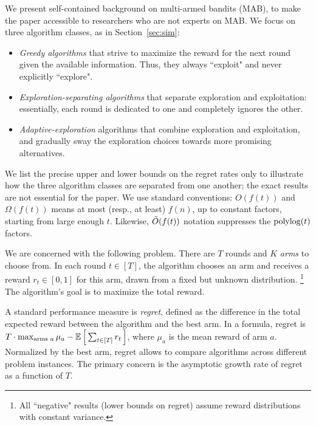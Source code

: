 We present self-contained background on multi-armed bandits (MAB), to make the paper accessible to researchers who are not experts on MAB. We focus on three algorithm classes, as in Section~\ref{sec:sim}:

\begin{itemize}
\item \emph{Greedy algorithms} that strive to maximize the reward for the next round given the available information. Thus, they always ``exploit" and never explicitly ``explore".

\item \emph{Exploration-separating algorithms}
 that separate exploration and exploitation: essentially, each round is dedicated to one and completely ignores the other.

\item \emph{Adaptive-exploration} algorithms that combine exploration and exploitation, and gradually sway the exploration choices towards more promising alternatives.
\end{itemize}

We list the precise upper and lower bounds on the regret rates only to illustrate how the three algorithm classes are separated from one another; the exact results are not essential for the paper. We use standard conventions: $O(f(t))$ and $\Omega(f(t))$ means at most (resp., at least) $f(n)$, up to constant factors, starting from large enough $t$. Likewise, $\tilde{O}(f(t))$ notation suppresses the $\polylog(t)$ factors.



We are concerned with the following problem. There are $T$ rounds and $K$ \emph{arms} to choose from. In each round $t\in [T]$, the algorithm chooses an arm and receives a reward $r_t\in[0,1]$ for this arm, drawn from a fixed but unknown distribution.%
\footnote{All ``negative" results (\ie lower bounds on regret) assume reward distributions with constant variance.}
The algorithm's goal is to maximize the total reward.

A standard performance measure is \emph{regret}, defined as the difference in the total expected reward between the algorithm and the best arm. In a formula, regret is
    $T\cdot \max_{\text{arms $a$}}\mu_a
    -  \E\sbr{ \sum_{t\in[T]} r_t }$,
where $\mu_a$ is the mean reward of arm $a$.
Normalized by the best arm, regret allows to compare algorithms across different problem instances.
The primary concern is the asymptotic growth rate of regret as a function of $T$.

